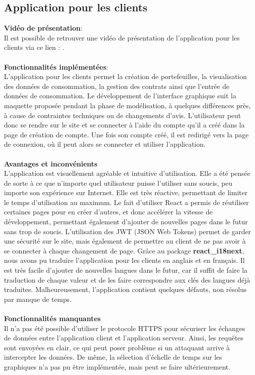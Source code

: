 \documentclass[../rapport.tex]{subfiles}
\begin{document}
\subsection{Application pour les clients}
\noindent \textbf{Vidéo de présentation}: \\ 
Il est possible de retrouver une vidéo de présentation de l'application pour les clients via ce lien : . \\ \\
\textbf{Fonctionnalités implémentées}: \\
L'application pour les clients permet la création de portefeuilles, la visualisation des données de consommation, la gestion des contrats ainsi que l'entrée de données de consommation. 
Le développement de l'interface graphique suit la maquette proposée pendant la phase de modélisation, à quelques différences près, à cause de contraintes techniques ou de changements d'avis. L'utilisateur peut donc se rendre sur le site et se connecter à l'aide du compte qu'il a créé dans la page de création de compte. Une fois son compte créé, il est redirigé vers la page de connexion, où il peut alors se connecter et utiliser l'application.
\\ \\
\textbf{Avantages et inconvénients} \\
L'application est visuellement agréable et intuitive d'utilisation. Elle a été pensée de sorte à ce que n'importe quel utilisateur puisse l'utiliser sans soucis, peu importe son expérience sur Internet. Elle est très réactive, permettant de limiter le temps d'utilisation au maximum. Le fait d'utiliser React a permis de réutiliser certaines pages pour en créer d'autres, et donc accélérer la vitesse de développement, permettant également d'ajouter de nouvelles pages dans le futur sans trop de soucis. L'utilisation des JWT (JSON Web Tokens) permet de garder une sécurité sur le site, mais également de permettre au client de ne pas avoir à se connecter à chaque changement de page.
Grâce au package \textbf{react\_i18next}, nous avons pu traduire l'application pour les clients en anglais et en français. Il est très facile d'ajouter de nouvelles langues dans le futur, car il suffit de faire la traduction de chaque valeur et de les faire correspondre aux clés des langues déjà traduites.
Malheureusement, l'application contient quelques défauts, non résolus par manque de temps. 
\\ \\
\textbf{Fonctionnalités manquantes} \\
Il n'a pas été possible d'utiliser le protocole HTTPS pour sécuriser les échanges de données entre l'application client et l'application serveur. Ainsi, les requêtes sont envoyées en clair, ce qui peut poser problème si un attaquant arrive à intercepter les données. De même, la sélection d'échelle de temps sur les graphiques n'a pas pu être implémentée, mais peut se faire ultérieurement.
\end{document}
